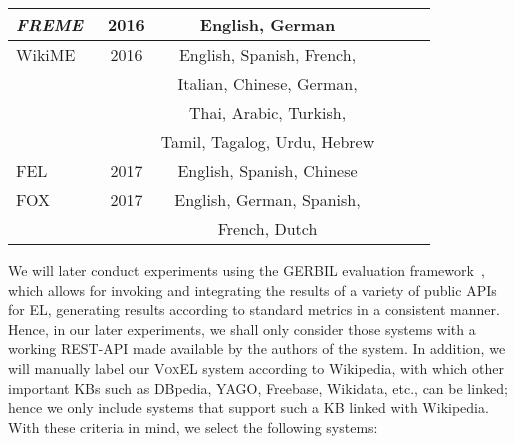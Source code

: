 \documentclass{llncs}
\newcommand{\cmark}{\ding{51}}%
\newcommand{\xmark}{\ding{55}}%
\begin{document}
\begin{table}[t]
\begin{tabular}{lccccr}
		\textit{FREME}~\cite{freme-ner2016}&2016&English, German&\xmark&\cmark&\cmark\\\midrule
		
		WikiME \cite{Cross-Lingual-Wikifier-tsai2016cross} & 2016 & English, Spanish, French,&\cmark&\xmark&\xmark\\
		& &Italian, Chinese, German,&&&\\
		& &Thai, Arabic, Turkish,&&&\\
		& &Tamil, Tagalog, Urdu, Hebrew&&&\\\midrule		
		
		FEL~\cite{FEL-pappu2017lightweight}& 2017 &English, Spanish, Chinese&\xmark&\cmark&\xmark\\\midrule
		
		FOX~\cite{fox2017}&2017&English, German, Spanish,&\cmark&\cmark&\cmark\\
		& & French, Dutch &&&\\
		
		\bottomrule
	\end{tabular}
\end{table}

We will later conduct experiments using the GERBIL evaluation framework~\cite{GERBIL_usbeck2015evaluating}, which allows for invoking and integrating the results of a variety of public APIs for EL, generating results according to standard metrics in a consistent manner. Hence, in our later experiments, we shall only consider those systems with a working REST-API made available by the authors of the system. In addition, we will manually label our \textsc{VoxEL} system according to Wikipedia, with which other important KBs such as DBpedia, YAGO, Freebase, Wikidata, etc., can be linked; hence we only include systems that support such a KB linked with Wikipedia. With these criteria in mind, we select the following systems: 
\end{document}
